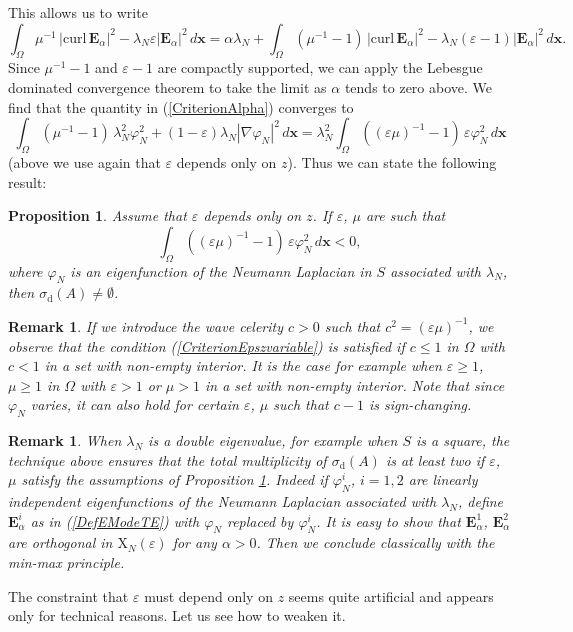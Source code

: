 \documentclass[11pt,a4paper]{article}
\newcommand{\eps}{\varepsilon}
\newcommand{\Om}{\Omega}
\newcommand{\mrm}[1]{\mathrm{#1}}
\newcommand{\bfx}{\boldsymbol{x}}
\newcommand{\mX}{\mrm{X}}
\newcommand{\curlvec}{\boldsymbol{\mrm{curl}}\,}
\def\E{\boldsymbol{E}}
\newtheorem{remark}[theorem]{Remark}
\newtheorem{proposition}[theorem]{Proposition}
\begin{document}
This allows us to write
\begin{equation}\label{CriterionAlpha}
\int_{\Om}\mu^{-1}\,|\curlvec\E_\alpha|^2-\lambda_N\eps|\E_\alpha|^2\,d\bfx = \alpha\lambda_N+\int_{\Om}(\mu^{-1}-1)\,|\curlvec\E_\alpha|^2-\lambda_N(\eps-1)|\E_\alpha|^2\,d\bfx.
\end{equation}
Since $\mu^{-1}-1$ and $\eps-1$ are compactly supported, we can apply the Lebesgue dominated convergence theorem to take the limit as $\alpha$ tends to zero above. We find that the quantity in (\ref{CriterionAlpha}) converges to 
\[
\int_{\Om}(\mu^{-1}-1)\,\lambda^2_N\varphi_N^2+(1-\eps)\lambda_N|\nabla\varphi_N|^2\,d\bfx=\lambda^2_N\int_{\Om}((\eps\mu)^{-1}-1)\,\eps\varphi_N^2\,d\bfx
\]
(above we use again that $\eps$ depends only on $z$). Thus we can state the following result:
\begin{proposition}\label{Proposition1Variable}
Assume that $\eps$ depends only on $z$. If $\eps$, $\mu$ are such that
\begin{equation}\label{CriterionEpszvariable}
\int_{\Om}((\eps\mu)^{-1}-1)\,\eps\varphi_N^2\,d\bfx<0,
\end{equation}
where $\varphi_N$ is an eigenfunction of the Neumann Laplacian in $S$ associated with $\lambda_N$, then $\sigma_{\mrm{d}}(A)\ne\emptyset$. 
\end{proposition}
\begin{remark}
If we introduce the wave celerity $c>0$ such that $c^{2}=(\eps\mu)^{-1}$, we observe that the condition (\ref{CriterionEpszvariable}) is satisfied if $c\le1$ in $\Om$ with $c<1$ in a set with non-empty interior. It is the case for example when
$\eps\ge1$, $\mu\ge1$ in $\Om$ with $\eps>1$ or $\mu>1$ in a set with non-empty interior. Note that since $\varphi_N$ varies, it can also hold for certain $\eps$, $\mu$ such that $c-1$ is sign-changing. 
\end{remark}
\begin{remark}
When $\lambda_N$ is a double eigenvalue, for example when $S$ is a square, the technique above ensures that the total multiplicity of $\sigma_{\mrm{d}}(A)$ is at least two if $\eps$, $\mu$ satisfy the assumptions of Proposition \ref{Proposition1Variable}. Indeed if $\varphi_N^i$, $i=1,2$ are linearly independent eigenfunctions of the Neumann Laplacian associated with $\lambda_N$, define $\E_\alpha^i$ as in (\ref{DefEModeTE}) with $\varphi_N$ replaced by $\varphi_N^i$. It is easy to show that $\E_\alpha^1$, $\E_\alpha^2$ are orthogonal in $\boldsymbol{\mX}_N(\eps)$ for any $\alpha>0$. Then we conclude classically with the min-max principle.
\end{remark}
\noindent The constraint that $\eps$ must depend only on $z$ seems quite artificial and appears only for technical reasons. Let us see how to weaken it.
\end{document}
